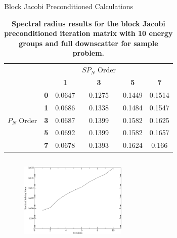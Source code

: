 \documentclass{beamer}
\begin{document}
\begin{frame}{Block Jacobi Preconditioned Calculations}

{\tiny  \begin{table}[h!]
    \begin{center}
      \begin{tabular}{cccccc}\hline\hline
        \multicolumn{1}{c}{}& 
        \multicolumn{1}{c}{}& 
        \multicolumn{1}{c}{}& 
        \multicolumn{1}{c}{$SP_N$ Order}& 
        \multicolumn{1}{c}{}& 
        \multicolumn{1}{c}{} \\
        &   & \textbf{1} & \textbf{3} & \textbf{5} & \textbf{7}  \\
        & \textbf{0} & 0.0647 & 0.1275 & 0.1449 & 0.1514 \\
        & \textbf{1} & 0.0686 & 0.1338 & 0.1484 & 0.1547 \\
        $P_N$ Order & \textbf{3} & 0.0687 & 0.1399 & 0.1582 & 0.1625 \\
        & \textbf{5} & 0.0692 & 0.1399 & 0.1582 & 0.1657 \\
        & \textbf{7} & 0.0678 & 0.1393 & 0.1624 & 0.166 \\
        \hline\hline
      \end{tabular}
    \end{center}
    \caption{\textbf{Spectral radius results for the block Jacobi
        preconditioned iteration matrix with 10 energy groups and full
        downscatter for sample problem.}}
    \label{tab:group10dsbj}
  \end{table}
}

  \begin{columns}

    \begin{column}{0.5\textwidth}

      \begin{figure}[t!]
        \begin{center}
          \includegraphics[width=2.0in]{block_jacobi_res.pdf}
        \end{center}
      \end{figure}


\end{column}
\end{columns}
\end{frame}
\end{document}
